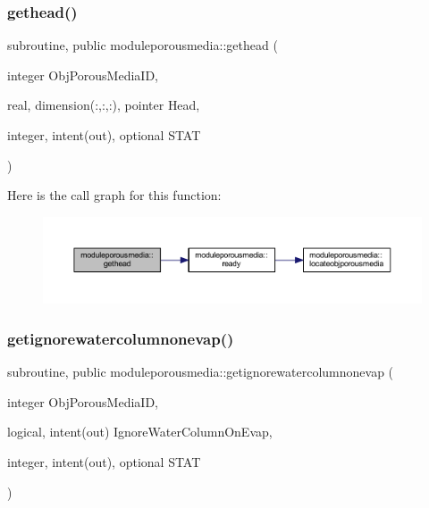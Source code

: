 \subsubsection{\texorpdfstring{gethead()}{gethead()}}
{\footnotesize\ttfamily subroutine, public moduleporousmedia\+::gethead (\begin{DoxyParamCaption}\item[{integer}]{Obj\+Porous\+Media\+ID,  }\item[{real, dimension(\+:,\+:,\+:), pointer}]{Head,  }\item[{integer, intent(out), optional}]{S\+T\+AT }\end{DoxyParamCaption})}

Here is the call graph for this function\+:\nopagebreak
\begin{figure}[H]
\begin{center}
\leavevmode
\includegraphics[width=350pt]{namespacemoduleporousmedia_a19324728630ae49f29d577f63d3f8523_cgraph}
\end{center}
\end{figure}
\mbox{\label{namespacemoduleporousmedia_ab3b8a6941c7523cd30e46b5a95be57de}} 
\subsubsection{\texorpdfstring{getignorewatercolumnonevap()}{getignorewatercolumnonevap()}}
{\footnotesize\ttfamily subroutine, public moduleporousmedia\+::getignorewatercolumnonevap (\begin{DoxyParamCaption}\item[{integer}]{Obj\+Porous\+Media\+ID,  }\item[{logical, intent(out)}]{Ignore\+Water\+Column\+On\+Evap,  }\item[{integer, intent(out), optional}]{S\+T\+AT }\end{DoxyParamCaption})}

